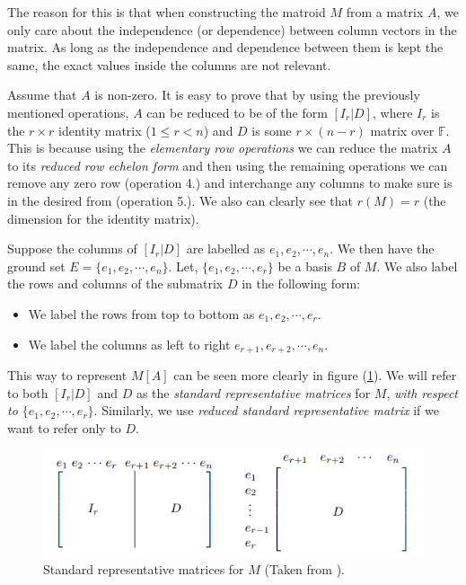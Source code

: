 The reason for this is that when constructing the matroid $M$ from a matrix $A$, we only care about the independence (or dependence) between column vectors in the matrix. As long as the independence and dependence between them is kept the same, the exact values inside the columns are not relevant.

Assume that $A$ is non-zero. It is easy to prove that by using the previously mentioned operations, $A$ can be reduced to be of the form $[I_r|D]$, where $I_r$ is the $r \times r$ identity matrix ($1\leq r< n$) and $D$ is some $r \times (n-r)$ matrix over $\mathbb{F}$. This is because using the \textit{elementary row operations} we can reduce the matrix $A$ to its \textit{reduced row echelon form} and then using the remaining operations we can remove any zero row (operation 4.) and interchange any columns to make sure is in the desired from (operation 5.). We also can clearly see that $r(M)=r$ (the dimension for the identity matrix). 

Suppose the columns of $[I_r|D]$ are labelled as $e_1, e_2,\cdots,e_n$. We then have the ground set $E=\{e_1, e_2,\cdots,e_n\}$. Let, $\{e_1, e_2,\cdots,e_r\}$ be a basis $B$ of $M$. We also label the rows and columns of the submatrix $D$ in the following form:
\begin{itemize}
  \item We label the rows from top to bottom as $e_1, e_2,\cdots,e_r$.
  \item We label the columns as left to right $e_{r+1}, e_{r+2},\cdots,e_n$.
\end{itemize}

  This way to represent $M[A]$ can be seen more clearly in figure (\ref{StandertRepMat}). We will refer to both $[I_r|D]$ and $D$ as the \textit{standard representative matrices} for $M$, \textit{with respect to $\{e_1, e_2,\cdots,e_r\}$}. Similarly, we use \textit{reduced standard representative matrix} if we want to refer only to $D$.

\begin{figure}[H]
    \centering
    \includegraphics{SRF.png}
    \caption{Standard representative matrices for $M$ (Taken from \cite[p. 78]{oxley1}).}
    \label{StandertRepMat}
\end{figure}

